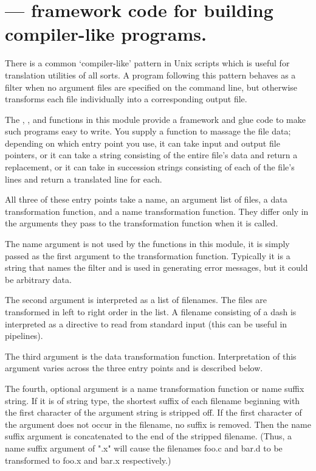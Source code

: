 \section{ ---
         framework code for building compiler-like programs.}


There is a common `compiler-like' pattern in Unix scripts which is useful
for translation utilities of all sorts.  A program following this pattern
behaves as a filter when no argument files are specified on the command
line, but otherwise transforms each file individually into a corresponding
output file.

The , , and
 functions in this module provide a framework and
glue code to make such programs easy to write.  You supply a function
to massage the file data; depending on which entry point you use, it
can take input and output file pointers, or it can take a string
consisting of the entire file's data and return a replacement, or it
can take in succession strings consisting of each of the file's lines
and return a translated line for each.

All three of these entry points take a name, an argument list of files,
a data transformation function, and a name transformation function.
They differ only in the arguments they pass to the transformation
function when it is called.

The name argument is not used by the functions in this module, it is
simply passed as the first argument to the transformation function. 
Typically it is a string that names the filter and is used in
generating error messages, but it could be arbitrary data.

The second argument is interpreted as a list of filenames.  The files
are transformed in left to right order in the list. A filename
consisting of a dash is interpreted as a directive to read from
standard input (this can be useful in pipelines).

The third argument is the data transformation function.
Interpretation of this argument varies across the three 
entry points and is described below.

The fourth, optional argument is a name transformation function or
name suffix string.  If it is of string type, the shortest suffix of each
filename beginning with the first character of the argument string
is stripped off.  If the first character of the argument does not 
occur in the filename, no suffix is removed.  Then the name suffix
argument is concatenated to the end of the stripped filename.  (Thus,
a name suffix argument of ".x" will cause the filenames foo.c and
bar.d to be transformed to foo.x and bar.x respectively.)
  
